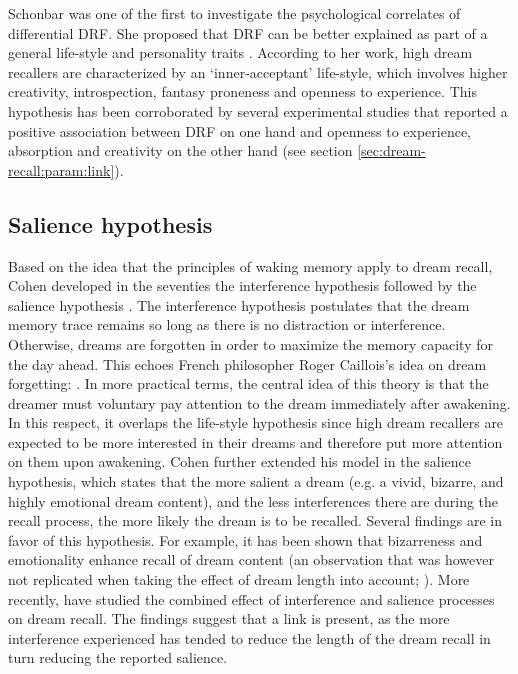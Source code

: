 Schonbar was one of the first to investigate the psychological correlates of differential DRF. She proposed that DRF can be better explained as part of a general life-style and personality traits \citep{schonbar_differential_1965}. According to her work, high dream recallers are characterized by an ‘inner-acceptant’ life-style, which involves higher creativity, introspection, fantasy proneness and openness to experience. This hypothesis has been corroborated by several experimental studies that reported a positive association between DRF on one hand and openness to experience, absorption and creativity on the other hand (see section \ref{sec:dream-recall:param:link}).

\subsection{Salience hypothesis}
\label{sec:dream-recall:theories:salience}

Based on the idea that the principles of waking memory apply to dream recall, Cohen developed in the seventies the interference hypothesis \citep{cohen_dream_1973} followed by the salience hypothesis \citep{cohen_test_1974}. The interference hypothesis postulates that the dream memory trace remains so long as there is no distraction or interference. Otherwise, dreams are forgotten in order to maximize the memory capacity for the day ahead. This echoes French philosopher Roger Caillois’s idea on dream forgetting:  \citep{caillois_incertitude_1956}. In more practical terms, the central idea of this theory is that the dreamer must voluntary pay attention to the dream immediately after awakening. In this respect, it overlaps the life-style hypothesis since high dream recallers are expected to be more interested in their dreams and therefore put more attention on them upon awakening.
Cohen further extended his model in the salience hypothesis, which states that the more salient a dream (e.g. a vivid, bizarre, and highly emotional dream content), and the less interferences there are during the recall process, the more likely the dream is to be recalled. Several findings are in favor of this hypothesis. For example, it has been shown that bizarreness \citep{cipolli_bizarreness_1993} and emotionality \citep{schredl_emotions_1998} enhance recall of dream content (an observation that was however not replicated when taking the effect of dream length into account; \citealp{schredl_relationship_2000}). More recently, \citet{parke_re-examination_2009} have studied the combined effect of interference and salience processes on dream recall. The findings suggest that a link is present, as the more interference experienced has tended to reduce the length of the dream recall in turn reducing the reported salience.

